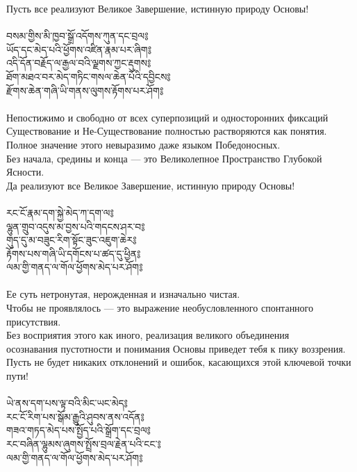 Пусть все реализуют Великое Завершение, истинную природу Основы!\\
\\
\ti བསམ་གྱིས་མི་ཁྱབ་སྒྲོ་འདོགས་ཀུན་དང་བྲལ༔\\
ཡོད་དང་མེད་པའི་ཕྱོགས་འཛིན་རྣམ་པར་ཞིག༔\\
འདི་དོན་བརྗོད་ལ་རྒྱལ་བའི་ལྗགས་ཀྱང་རྡུགས༔\\
ཐོག་མཐའ་བར་མེད་གཏིང་གསལ་ཆེན་པོའི་དབྱིངས༔\\
རྫོགས་ཆེན་གཞི་ཡི་གནས་ལུགས་རྟོགས་པར་ཤོག༔\\
\\
\ru
Непостижимо и свободно от всех суперпозиций и односторонних фиксаций\\
Существование и Не-Существование полностью растворяются как понятия.\\
Полное значение этого невыразимо даже языком Победоносных.\\
Без начала, средины и конца — это Великолепное Пространство Глубокой Ясности.\\
Да реализуют все Великое Завершение, истинную природу Основы!\\
\\
\newpage
\ti རང་ངོ་རྣམ་དག་སྐྱེ་མེད་ཀ་དག་ལ༔\\
ལྷུན་གྲུབ་འདུས་མ་བྱས་པའི་གདངས་ཤར་བ༔\\
གུད་དུ་མ་བཟུང་རིག་སྟོང་ཟུང་འཇུག་ཆེར༔\\
རྟོགས་པས་གཞི་ཡི་དགོངས་པ་ཚད་དུ་ཕྱིན༔\\
ལམ་གྱི་གནད་ལ་གོལ་ཕྱོགས་མེད་པར་ཤོག༔\\
\\
\ru
Ее суть нетронутая, нерожденная и изначально чистая.\\
Чтобы не проявлялось — это выражение необусловленного спонтанного присутствия.\\
Без восприятия этого как иного, реализация великого объединения\\
осознавания пустотности и понимания Основы приведет тебя к пику воззрения.\\
Пусть не будет никаких отклонений и ошибок, касающихся этой ключевой точки пути!\\
\\
\ti ཡེ་ནས་དག་པས་ལྟ་བའི་མིང་ཡང་མེད༔\\
རང་ངོ་རིག་པས་སྒོམ་རྒྱུའི་ཤུབས་ནས་འདོན༔\\
གཟའ་གཏད་མེད་པས་སྤྱོད་པའི་སྒྲོག་དང་བྲལ༔\\
རང་བཞིན་ལྷུམས་ཞུགས་སྤྲོས་བྲལ་རྗེན་པའི་ངང༌༔\\
ལམ་གྱི་གནད་ལ་གོལ་ཕྱོགས་མེད་པར་ཤོག༔\\
